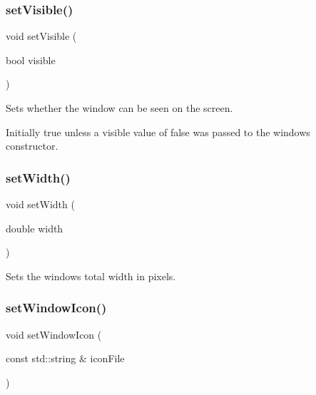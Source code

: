 \subsubsection{\texorpdfstring{set\+Visible()}{setVisible()}}
{\footnotesize\ttfamily void set\+Visible (\begin{DoxyParamCaption}\item[{bool}]{visible }\end{DoxyParamCaption})\hspace{0.3cm}{\ttfamily [virtual]}}



Sets whether the window can be seen on the screen. 

Initially true unless a visible value of false was passed to the window\textquotesingle{}s constructor. \mbox{\label{classGWindow_aa3f3fba4cb131baa8696ba01e3bceca1}} 
\subsubsection{\texorpdfstring{set\+Width()}{setWidth()}}
{\footnotesize\ttfamily void set\+Width (\begin{DoxyParamCaption}\item[{double}]{width }\end{DoxyParamCaption})\hspace{0.3cm}{\ttfamily [virtual]}}



Sets the window\textquotesingle{}s total width in pixels. 

\mbox{\label{classGWindow_ab21f6abd314b7ffd3ccf7b6e18ac18cb}} 
\subsubsection{\texorpdfstring{set\+Window\+Icon()}{setWindowIcon()}}
{\footnotesize\ttfamily void set\+Window\+Icon (\begin{DoxyParamCaption}\item[{const std\+::string \&}]{icon\+File }\end{DoxyParamCaption})\hspace{0.3cm}{\ttfamily [virtual]}}



